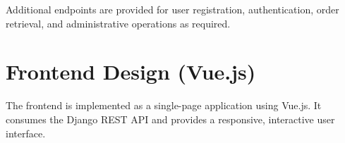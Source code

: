 
Additional endpoints are provided for user registration, authentication, order retrieval, and administrative operations as required.

\section{Frontend Design (Vue.js)}
The frontend is implemented as a single-page application using Vue.js. It consumes the Django REST API and provides a responsive, interactive user interface.

